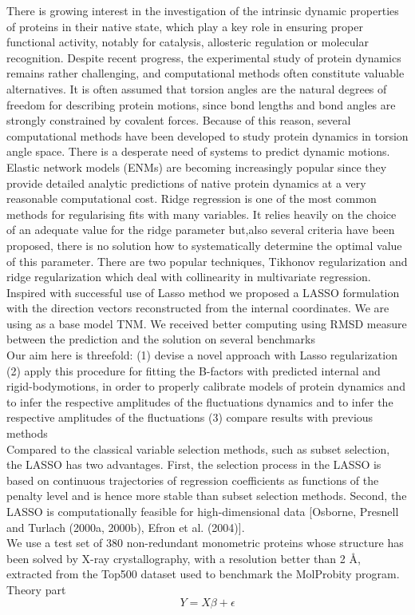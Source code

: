 \documentclass[12pt,twoside]{article}
\begin{document}
        There is growing interest in the investigation of the intrinsic dynamic properties of proteins in their native state, which play a key role in ensuring proper functional activity, notably for catalysis, allosteric regulation or molecular recognition. Despite recent progress, the experimental study of protein dynamics remains rather challenging, and computational methods often constitute valuable alternatives. It is often assumed that torsion angles are the natural degrees of freedom for describing protein motions,
since bond lengths and bond angles are strongly constrained by covalent forces. Because of this reason,
several computational methods have been developed to study protein dynamics in torsion angle space. There is a desperate need of systems to predict dynamic motions. Elastic network models (ENMs) are becoming increasingly popular since they provide detailed analytic predictions of native protein dynamics at a very reasonable computational cost. Ridge regression is one of the most common methods for regularising fits with many variables.  It relies heavily on the choice of an adequate value for the ridge parameter but,also several criteria have been proposed, there is no solution how to systematically determine the optimal value of this parameter. There are two popular techniques, Tikhonov regularization and ridge regularization which deal with collinearity in multivariate regression. Inspired with successful use of Lasso method we proposed a LASSO formulation with the direction vectors reconstructed from the internal coordinates. We are using as a base model TNM.  We received better  computing using RMSD measure between the prediction and the solution on several benchmarks\\Our aim here is threefold: (1) devise a novel approach with Lasso regularization (2) apply this procedure for fitting the B-factors with predicted internal and rigid-bodymotions, in order to properly calibrate models of protein dynamics and to infer the respective amplitudes of the fluctuations dynamics and to infer the respective amplitudes of the fluctuations (3) compare results with previous methods\\Compared to the classical variable selection methods, such as subset selection, the LASSO has two advantages. First, the selection process in the LASSO is based on continuous trajectories of regression coefficients as functions of the penalty level and is hence more stable than subset selection methods. Second, the LASSO is computationally feasible for high-dimensional data [Osborne, Presnell and Turlach (2000a, 2000b), Efron et al. (2004)].\\We use a test set of 380 non-redundant monometric proteins whose structure has been solved by X-ray crystallography, with a resolution better than 2 Å, extracted from the Top500 dataset used to benchmark the MolProbity program.\\Theory part\begin{equation}
\label{eq:linreg}
Y = X\beta + \epsilon
\end{equation}
\end{document}
